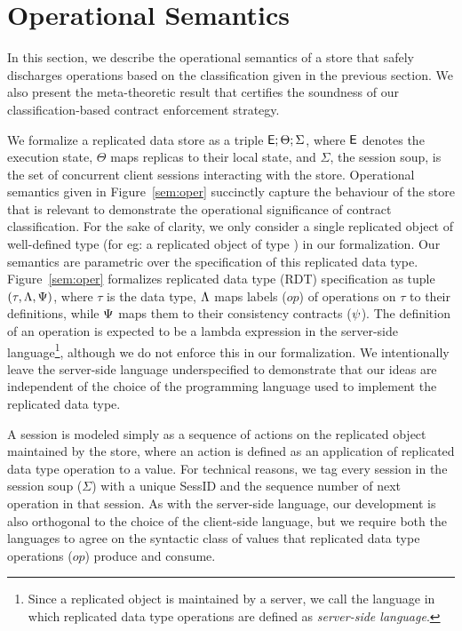 \section{Operational Semantics}
\label{sec:core-opsem}

In this section, we describe the operational semantics of a store that safely
discharges operations based on the classification given in the previous section. We also present the
meta-theoretic result that certifies the soundness of our classification-based
contract enforcement strategy.

We formalize a replicated data store as a triple ${\normalfont \textsf{E}};\Theta;\Sigma$,
where ${\normalfont \textsf{E}}$ denotes the execution state, $\Theta$ maps replicas to
their local state, and $\Sigma$, the session soup, is the set of
concurrent client sessions interacting with the store.  Operational
semantics given in Figure~\ref{sem:oper} succinctly capture the
behaviour of the store that is relevant to demonstrate the operational
significance of contract classification. For the sake of clarity, we
only consider a single replicated object of well-defined type (for eg:
a replicated object of type ) in our formalization.
Our semantics are parametric over the specification of this replicated
data type.  Figure~\ref{sem:oper} formalizes replicated data type
(RDT) specification as tuple $(\tau,\Lambda,\Psi)$, where $\tau$ is the
data type, $\Lambda$ maps labels ($op$) of operations on $\tau$ to their
definitions, while $\Psi$ maps them to their consistency contracts
($\psi$). The definition of an operation is expected to be a lambda
expression in the server-side language\footnote{Since a replicated
object is maintained by a server, we call the language in which
replicated data type operations are defined as \emph{server-side
language}.}, although we do not enforce this in our formalization. We
intentionally leave the server-side language underspecified to
demonstrate that our ideas are independent of the choice of the
programming language used to implement the replicated data type.



A session is modeled simply as a sequence of actions on the replicated
object maintained by the store, where an action is defined as an
application of replicated data type operation to a value. For
technical reasons, we tag every session in the session soup ($\Sigma$)
with a unique {\sf SessID} and the sequence number of next operation
in that session. As with the server-side language, our development is
also orthogonal to the choice of the client-side language, but we
require both the languages to agree on the syntactic class of values
that replicated data type operations ($op$) produce and consume.


